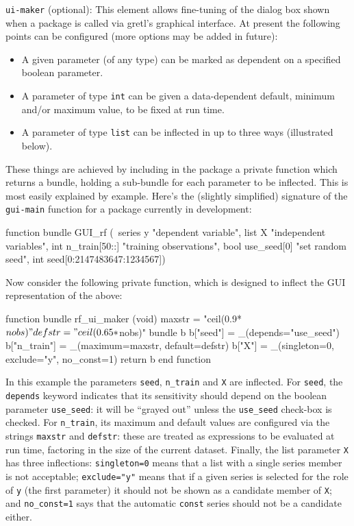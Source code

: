 \documentclass[oneside]{book}
\begin{document}
\begin{description}
\item \texttt{ui-maker} (optional): This element allows fine-tuning of
  the dialog box shown when a package is called via gretl's graphical
  interface. At present the following points can be configured (more
  options may be added in future):
  \begin{itemize}
  \item A given parameter (of any type) can be marked as dependent on
    a specified boolean parameter.
  \item A parameter of type \texttt{int} can be given a data-dependent
    default, minimum and/or maximum value, to be fixed at run time.
  \item A parameter of type \texttt{list} can be inflected in up to
    three ways (illustrated below).
  \end{itemize}
  These things are achieved by including in the package a private
  function which returns a bundle, holding a sub-bundle for each
  parameter to be inflected.  This is most easily explained by
  example. Here's the (slightly simplified) signature of the
  \texttt{gui-main} function for a package currently in development:
\begin{code}
function bundle GUI_rf (\
   series y "dependent variable",
   list X "independent variables",
   int n_train[50::] "training observations",
   bool use_seed[0] "set random seed",
   int seed[0:2147483647:1234567])
\end{code}
  Now consider the following private function, which is designed to
  inflect the GUI representation of the above:
\begin{code}
function bundle rf_ui_maker (void)
   maxstr = "ceil(0.9*$nobs)"
   defstr = "ceil(0.65*$nobs)"
   bundle b
   b["seed"] = _(depends="use_seed")
   b["n_train"] = _(maximum=maxstr, default=defstr)
   b["X"] = _(singleton=0, exclude="y", no_const=1)
   return b
end function
\end{code}
  In this example the parameters \texttt{seed}, \texttt{n\_train} and
  \texttt{X} are inflected. For \texttt{seed}, the \texttt{depends}
  keyword indicates that its sensitivity should depend on the boolean
  parameter \texttt{use\_seed}: it will be ``grayed out'' unless the
  \texttt{use\_seed} check-box is checked. For \texttt{n\_train}, its
  maximum and default values are configured via the strings
  \texttt{maxstr} and \texttt{defstr}: these are treated as
  expressions to be evaluated at run time, factoring in the size of
  the current dataset.  Finally, the list parameter \texttt{X} has
  three inflections: \texttt{singleton=0} means that a list with a
  single series member is not acceptable; \texttt{exclude="y"} means
  that if a given series is selected for the role of \texttt{y} (the
  first parameter) it should not be shown as a candidate member of
  \texttt{X}; and \texttt{no\_const=1} says that the automatic
  \texttt{const} series should not be a candidate either.


\end{description}
\end{document}
